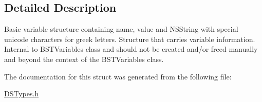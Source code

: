 \subsection{Detailed Description}
Basic variable structure containing name, value and NSString with special unicode characters for greek letters. Structure that carries variable information. Internal to BSTVariables class and should not be created and/or freed manually and beyond the context of the BSTVariables class. 

The documentation for this struct was generated from the following file:\begin{DoxyCompactItemize}
\item 
\hyperlink{_d_s_types_8h}{DSTypes.h}\end{DoxyCompactItemize}
